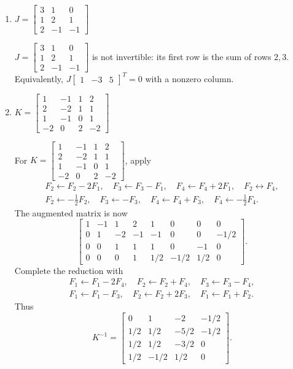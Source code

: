 \begin{enumerate}[label=\alph*)]
\item $J=\begin{bmatrix}3&1&0\\1&2&1\\2&-1&-1\end{bmatrix}$

\begin{answer}
$J=\begin{bmatrix}3&1&0\\1&2&1\\2&-1&-1\end{bmatrix}$ is not invertible:
its first row is the sum of rows $2,3$. Equivalently,
$J\begin{bmatrix}1&-3&5\end{bmatrix}^T=0$ with a nonzero column.
\end{answer}

\item $K=\begin{bmatrix}1&-1&1&2\\2&-2&1&1\\1&-1&0&1\\-2&0&2&-2\end{bmatrix}$

\begin{answer}
For $K=\begin{bmatrix}1&-1&1&2\\2&-2&1&1\\1&-1&0&1\\-2&0&2&-2\end{bmatrix}$,
apply
\[
\begin{gathered}
 F_2\gets F_2-2F_1,\quad F_3\gets F_3-F_1,\quad F_4\gets F_4+2F_1,\quad
 F_2\leftrightarrow F_4,\\
 F_2\gets-\tfrac12F_2,\quad F_3\gets-F_3,\quad
 F_4\gets F_4+F_3,\quad F_4\gets-\tfrac12F_4.
\end{gathered}
\]
The augmented matrix is now
\[
\left[\begin{array}{rrrr|rrrr}
1&-1&1&2&1&0&0&0\\
0&1&-2&-1&-1&0&0&-1/2\\
0&0&1&1&1&0&-1&0\\
0&0&0&1&1/2&-1/2&1/2&0
\end{array}\right].
\]
Complete the reduction with
\[
\begin{gathered}
 F_1\gets F_1-2F_4,\quad F_2\gets F_2+F_4,\quad F_3\gets F_3-F_4,\\
 F_1\gets F_1-F_3,\quad F_2\gets F_2+2F_3,\quad F_1\gets F_1+F_2.
\end{gathered}
\]
Thus
\[
 K^{-1}=\begin{bmatrix}
0&1&-2&-1/2\\1/2&1/2&-5/2&-1/2\\
1/2&1/2&-3/2&0\\1/2&-1/2&1/2&0
\end{bmatrix}.
\]
\end{answer}
\end{enumerate}
